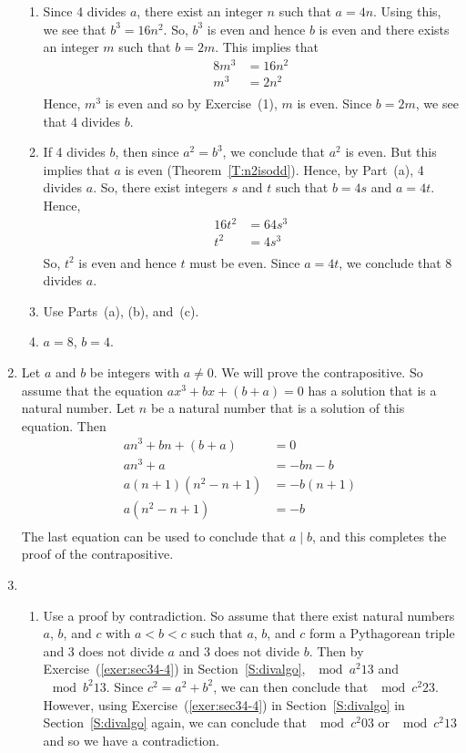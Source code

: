 \begin{enumerate}
\begin{enumerate}
\item Since 4 divides $a$, there exist an integer $n$ such that $a = 4n$.  Using this, we see that $b^3 = 16n^2$. So, $b^3$ is even and hence $b$ is even and there exists an integer $m$ such that $b = 2m$.  This implies that
\[
\begin{aligned}
8m^3 &= 16n^2 \\
m^3 &= 2n^2 \\
\end{aligned}
\]
Hence, $m^3$ is even and so by Exercise~(1), $m$ is even.  Since $b = 2m$, we see that 4 divides $b$.

\item If 4 divides $b$, then since $a^2 = b^3$, we conclude that $a^2$ is even.  But this implies that $a$ is even (Theorem~\ref{T:n2isodd}).  Hence, by Part~(a), 4 divides $a$.  So, there exist integers $s$ and $t$ such that $b = 4s$ and $a = 4t$.  Hence,
\[
\begin{aligned}
16t^2 &= 64s^3 \\
t^2 &= 4s^3 \\
\end{aligned}
\]
So, $t^2$ is even and hence $t$ must be even.  Since $a = 4t$, we conclude that 8 divides $a$.

\item Use Parts~(a), (b), and~(c).

\item $a = 8$, $b = 4$.
\end{enumerate}

\item Let $a$ and $b$ be integers with $a \ne 0$.  We will prove the contrapositive.  So assume that the equation $ax^3 + bx + \left( b + a \right) = 0$ has a solution that is a natural number.  Let $n$ be a natural number that is a solution of this equation.  Then
\[
\begin{aligned}
an^3 + bn + \left( b + a \right) &= 0 \\
an^3 + a &= -bn - b \\
a \left(n + 1\right) \left(n^2 - n + 1 \right) &= -b \left( n + 1 \right) \\
a \left( n^2 - n + 1 \right) &= -b \\
\end{aligned}
\]
The last equation can be used to conclude that $a \mid b$, and this completes the proof of the contrapositive.


\item \begin{enumerate}
\item  Use a proof by contradiction.  So assume that there exist natural numbers $a$, $b$, and $c$ with $a < b < c$ such that $a$, $b$, and $c$ form a Pythagorean triple and 3 does not divide $a$ and 3 does not divide $b$.  Then by Exercise~(\ref{exer:sec34-4}) in Section~\ref{S:divalgo}, $\mod{a^2}{1}{3}$ and $\mod{b^2}{1}{3}$.  Since $c^2 = a^2 + b^2$, we can then conclude that $\mod{c^2}{2}{3}$.  However, using Exercise~(\ref{exer:sec34-4}) in Section~\ref{S:divalgo} in Section~\ref{S:divalgo} again, we can conclude that $\mod{c^2}{0}{3}$ or $\mod{c^2}{1}{3}$ and so we have a contradiction.


\end{enumerate}
\end{enumerate}
